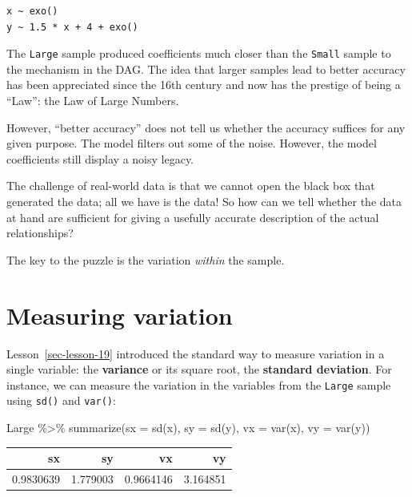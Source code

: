 \documentclass[
  letterpaper,
  DIV=11,
  numbers=noendperiod,
  oneside]{scrreprt}
\newenvironment{Shaded}{\begin{snugshade}}{\end{snugshade}}
\newcommand{\AttributeTok}[1]{\textcolor[rgb]{0.40,0.45,0.13}{#1}}
\newcommand{\FunctionTok}[1]{\textcolor[rgb]{0.28,0.35,0.67}{#1}}
\newcommand{\NormalTok}[1]{\textcolor[rgb]{0.00,0.23,0.31}{#1}}
\newcommand{\SpecialCharTok}[1]{\textcolor[rgb]{0.37,0.37,0.37}{#1}}
\begin{document}
\begin{verbatim}
x ~ exo()
y ~ 1.5 * x + 4 + exo()
\end{verbatim}

The \texttt{Large} sample produced coefficients much closer than the
\texttt{Small} sample to the mechanism in the DAG. The idea that larger
samples lead to better accuracy has been appreciated since the 16th
century and now has the prestige of being a ``Law'': the Law of Large
Numbers.

However, ``better accuracy'' does not tell us whether the accuracy
suffices for any given purpose. The model filters out some of the noise.
However, the model coefficients still display a noisy legacy.

The challenge of real-world data is that we cannot open the black box
that generated the data; all we have is the data! So how can we tell
whether the data at hand are sufficient for giving a usefully accurate
description of the actual relationships?

The key to the puzzle is the variation \emph{within} the sample.

\hypertarget{measuring-variation}{%
\section{Measuring variation}\label{measuring-variation}}

Lesson~\ref{sec-lesson-19} introduced the standard way to measure
variation in a single variable: the \textbf{variance} or its square
root, the \textbf{standard deviation}. For instance, we can measure the
variation in the variables from the \texttt{Large} sample using
\texttt{sd()} and \texttt{var()}:

\begin{Shaded}
\begin{Highlighting}[]
\NormalTok{Large }\SpecialCharTok{\%\textgreater{}\%}
  \FunctionTok{summarize}\NormalTok{(}\AttributeTok{sx =} \FunctionTok{sd}\NormalTok{(x), }\AttributeTok{sy =} \FunctionTok{sd}\NormalTok{(y), }\AttributeTok{vx =} \FunctionTok{var}\NormalTok{(x), }\AttributeTok{vy =} \FunctionTok{var}\NormalTok{(y))}
\end{Highlighting}
\end{Shaded}

\ttfamily 
\begin{tabular}{rrrr}
\toprule
sx & sy & vx & vy\\
\midrule
0.9830639 & 1.779003 & 0.9664146 & 3.164851\\
\bottomrule
\end{tabular} \normalfont
\bigskip
\end{document}
